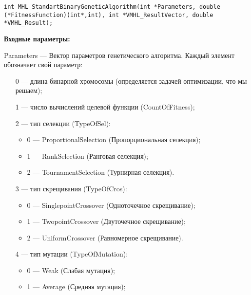 \documentclass[a4paper,12pt]{article}
\begin{document}
\begin{lstlisting}[label=code_syntax_MHL_StandartBinaryGeneticAlgorithm,caption=Синтаксис]
int MHL_StandartBinaryGeneticAlgorithm(int *Parameters, double (*FitnessFunction)(int*,int), int *VMHL_ResultVector, double *VMHL_Result);
\end{lstlisting}

\textbf{Входные параметры:}
 
Parameters --- Вектор параметров генетического алгоритма. Каждый элемент обозначает свой параметр:
 
 \begin{itemize}
 \item [0] --- длина бинарной хромосомы (определяется задачей оптимизации, что мы решаем);
 
 \item [1] --- число вычислений целевой функции (CountOfFitness);
 
 \item [2] --- тип селекции (TypeOfSel):
 
 \begin{itemize}
       \item 0 --- ProportionalSelection (Пропорциональная селекция);
 
       \item 1 --- RankSelection (Ранговая селекция);
 
       \item 2 --- TournamentSelection (Турнирная селекция).
	    \end{itemize}
 
 \item [3] --- тип скрещивания (TypeOfCros):
  \begin{itemize}
       \item 0 --- SinglepointCrossover (Одноточечное скрещивание);
 
       \item 1 --- TwopointCrossover (Двуточечное скрещивание);
 
       \item 2 --- UniformCrossover (Равномерное скрещивание).
	    \end{itemize}
 
 \item [4] --- тип мутации (TypeOfMutation):
  \begin{itemize}
       \item 0 --- Weak (Слабая мутация);
 
       \item 1 --- Average (Средняя мутация);
 

\end{itemize}
\end{itemize}
\end{document}
